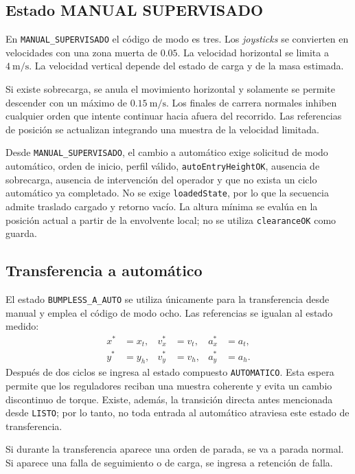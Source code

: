 \documentclass[a4paper,10pt,onecolumn,journal]{ieeeconf}
\numberwithin{equation}{section}
\begin{document}

\subsection{Estado MANUAL SUPERVISADO}
En \texttt{MANUAL\_SUPERVISADO} el código de modo es tres. Los \textit{joysticks} se convierten en velocidades con una zona muerta de $0.05$. La velocidad horizontal se limita a $4~\mathrm{m/s}$. La velocidad vertical depende del estado de carga y de la masa estimada.

Si existe sobrecarga, se anula el movimiento horizontal y solamente se permite descender con un máximo de $0.15~\mathrm{m/s}$. Los finales de carrera normales inhiben cualquier orden que intente continuar hacia afuera del recorrido. Las referencias de posición se actualizan integrando una muestra de la velocidad limitada.

Desde \texttt{MANUAL\_SUPERVISADO}, el cambio a automático exige solicitud de modo automático, orden de inicio, perfil válido, \texttt{autoEntryHeightOK}, ausencia de sobrecarga, ausencia de intervención del operador y que no exista un ciclo automático ya completado. No se exige \texttt{loadedState}, por lo que la secuencia admite traslado cargado y retorno vacío. La altura mínima se evalúa en la posición actual a partir de la envolvente local; no se utiliza \texttt{clearanceOK} como guarda.


\subsection{Transferencia a automático}
El estado \texttt{BUMPLESS\_A\_AUTO} se utiliza únicamente para la transferencia desde manual y emplea el código de modo ocho. Las referencias se igualan al estado medido:
\begin{align}
x^*&=x_t,&v_x^*&=v_t,&a_x^*&=a_t,\\
y^*&=y_h,&v_y^*&=v_h,&a_y^*&=a_h.
\end{align}
Después de dos ciclos se ingresa al estado compuesto \texttt{AUTOMATICO}. Esta espera permite que los reguladores reciban una muestra coherente y evita un cambio discontinuo de torque. Existe, además, la transición directa antes mencionada desde \texttt{LISTO}; por lo tanto, no toda entrada al automático atraviesa este estado de transferencia.

Si durante la transferencia aparece una orden de parada, se va a parada normal. Si aparece una falla de seguimiento o de carga, se ingresa a retención de falla.
\end{document}
